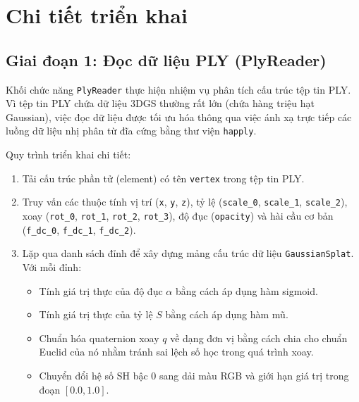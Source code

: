 \documentclass[a4paper,12pt]{report}
\begin{document}
\chapter{Chi tiết triển khai}

\section{Giai đoạn 1: Đọc dữ liệu PLY (PlyReader)}
Khối chức năng \texttt{PlyReader} thực hiện nhiệm vụ phân tích cấu trúc tệp tin PLY. Vì tệp tin PLY chứa dữ liệu 3DGS thường rất lớn (chứa hàng triệu hạt Gaussian), việc đọc dữ liệu được tối ưu hóa thông qua việc ánh xạ trực tiếp các luồng dữ liệu nhị phân từ đĩa cứng bằng thư viện \texttt{happly}.

Quy trình triển khai chi tiết:
\begin{enumerate}
    \item Tải cấu trúc phần tử (element) có tên \texttt{vertex} trong tệp tin PLY.
    \item Truy vấn các thuộc tính vị trí (\texttt{x}, \texttt{y}, \texttt{z}), tỷ lệ (\texttt{scale\_0}, \texttt{scale\_1}, \texttt{scale\_2}), xoay (\texttt{rot\_0}, \texttt{rot\_1}, \texttt{rot\_2}, \texttt{rot\_3}), độ đục (\texttt{opacity}) và hài cầu cơ bản (\texttt{f\_dc\_0}, \texttt{f\_dc\_1}, \texttt{f\_dc\_2}).
    \item Lặp qua danh sách đỉnh để xây dựng mảng cấu trúc dữ liệu \texttt{GaussianSplat}. Với mỗi đỉnh:
    \begin{itemize}
        \item Tính giá trị thực của độ đục $\alpha$ bằng cách áp dụng hàm sigmoid.
        \item Tính giá trị thực của tỷ lệ $S$ bằng cách áp dụng hàm mũ.
        \item Chuẩn hóa quaternion xoay $q$ về dạng đơn vị bằng cách chia cho chuẩn Euclid của nó nhằm tránh sai lệch số học trong quá trình xoay.
        \item Chuyển đổi hệ số SH bậc 0 sang dải màu RGB và giới hạn giá trị trong đoạn $[0.0, 1.0]$.
    \end{itemize}
\end{enumerate}
\end{document}
